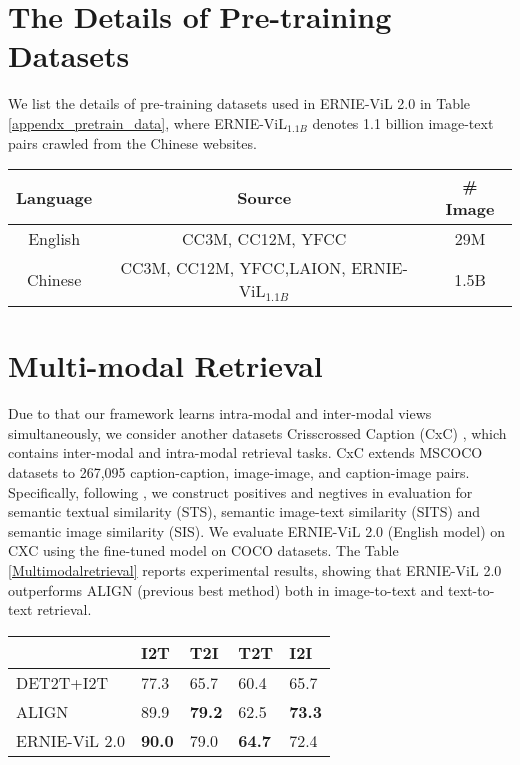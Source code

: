 \documentclass{article}
\begin{document}
  
  
\newpage



\appendix
\section{The Details of Pre-training Datasets}
We list the details of pre-training datasets used in ERNIE-ViL 2.0 in Table \ref{appendx_pretrain_data}, where ERNIE-ViL$_{1.1B}$ denotes 1.1 billion image-text pairs crawled from the Chinese websites.
\begin{table*}[]
\centering
\begin{tabular}{ccc}
\toprule
Language & Source & \# Image \\ \midrule
English & CC3M, CC12M, YFCC & 29M \\
Chinese & CC3M, CC12M, YFCC,LAION, ERNIE-ViL$_{1.1B}$ & 1.5B \\ \bottomrule
\end{tabular}
\caption{The details of pre-training datasets used in ERNIE-ViL 2.0}
\label{appendx_pretrain_data}
\end{table*}
\section{Multi-modal Retrieval}
\label{Multi-modal_retrieval}
Due to that our framework learns intra-modal and inter-modal views simultaneously, we consider another datasets Crisscrossed Caption (CxC) \cite{parekh2020crisscrossed}, which contains inter-modal and intra-modal retrieval tasks. CxC extends MSCOCO datasets to 267,095 caption-caption, image-image, and caption-image pairs. Specifically, following \cite{parekh2020crisscrossed}, we construct positives and negtives in evaluation for  semantic textual similarity (STS), semantic image-text similarity (SITS) and semantic image similarity (SIS). We evaluate ERNIE-ViL 2.0 (English model) on CXC using the fine-tuned model on COCO datasets. The Table \ref{Multimodalretrieval} reports experimental results, showing that ERNIE-ViL 2.0 outperforms ALIGN (previous best method) both in image-to-text and text-to-text retrieval. 

\begin{table*}[]
\centering
\begin{tabular}{lllll}
\toprule
    & I2T  & T2I  & T2T  & I2I  \\ \midrule
DET2T+I2T     & 77.3 & 65.7 & 60.4 & 65.7 \\
ALIGN         & 89.9 & \textbf{79.2} & 62.5 & \textbf{73.3} \\
ERNIE-ViL 2.0 & \textbf{90.0} & 79.0 & \textbf{64.7} & 72.4 \\ \bottomrule
\end{tabular}
\caption{Multimodal retrieval results at Crisscrossed Captions (CxC), compared with multi-modal methods: ALIGN \cite{Jia2021ScalingUV}, DET2T+I2T \cite{parekh2020crisscrossed}. The metric is the meanRecall (mR). I2T: text $\to$ image, I2T:image $\to$ text, I2I:image $\to$ image, T2T: text $\to$ text }
\label{Multimodalretrieval}
\end{table*}
\end{document}
